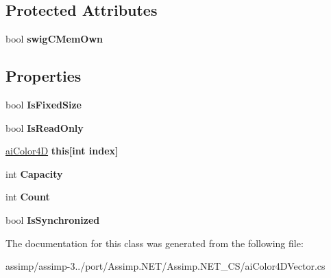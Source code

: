\subsection*{Protected Attributes}
\begin{DoxyCompactItemize}
\item 
\hypertarget{classai_color4_d_vector_a9a29cc851d30c5f54c3983f3fb4620bf}{bool {\bfseries swig\+C\+Mem\+Own}}\label{classai_color4_d_vector_a9a29cc851d30c5f54c3983f3fb4620bf}

\end{DoxyCompactItemize}
\subsection*{Properties}
\begin{DoxyCompactItemize}
\item 
\hypertarget{classai_color4_d_vector_a8f9e8a70d15f4fe7cd6884a4e00a7c41}{bool {\bfseries Is\+Fixed\+Size}}\label{classai_color4_d_vector_a8f9e8a70d15f4fe7cd6884a4e00a7c41}

\item 
\hypertarget{classai_color4_d_vector_a782fa0db453aff84ce6d3744c179472f}{bool {\bfseries Is\+Read\+Only}}\label{classai_color4_d_vector_a782fa0db453aff84ce6d3744c179472f}

\item 
\hypertarget{classai_color4_d_vector_ac985d25740a5f34973e8a35c7e645c81}{\hyperlink{structai_color4_d}{ai\+Color4\+D} {\bfseries this\mbox{[}int index\mbox{]}}}\label{classai_color4_d_vector_ac985d25740a5f34973e8a35c7e645c81}

\item 
\hypertarget{classai_color4_d_vector_aa5bbf8904e6a1aa6c57bffd1af79fb99}{int {\bfseries Capacity}}\label{classai_color4_d_vector_aa5bbf8904e6a1aa6c57bffd1af79fb99}

\item 
\hypertarget{classai_color4_d_vector_ac8b171451c7cd42539e7e2b031cd1f30}{int {\bfseries Count}}\label{classai_color4_d_vector_ac8b171451c7cd42539e7e2b031cd1f30}

\item 
\hypertarget{classai_color4_d_vector_ab1c9dcf71ff88890ac72a3ee1a34c8a7}{bool {\bfseries Is\+Synchronized}}\label{classai_color4_d_vector_ab1c9dcf71ff88890ac72a3ee1a34c8a7}

\end{DoxyCompactItemize}


The documentation for this class was generated from the following file\+:\begin{DoxyCompactItemize}
\item 
assimp/assimp-\/3../port/\+Assimp.\+N\+E\+T/\+Assimp.\+N\+E\+T\+\_\+\+C\+S/ai\+Color4\+D\+Vector.\+cs\end{DoxyCompactItemize}
